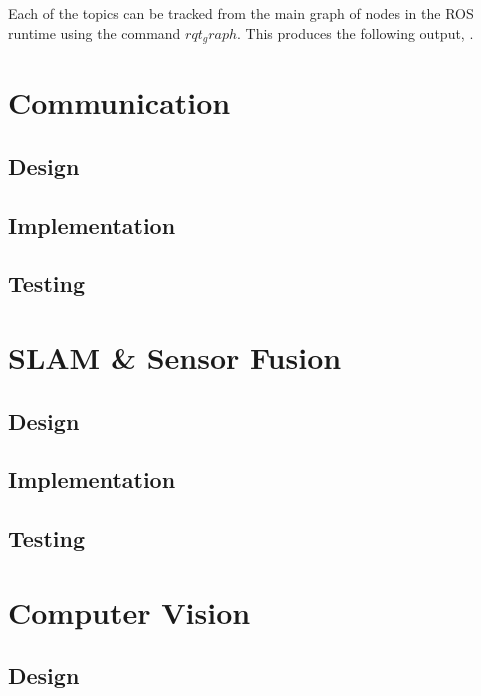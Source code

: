 Each of the topics can be tracked from the main graph of nodes in the ROS runtime using the command $rqt_graph$. This produces the following output, . 


\section{Communication}\label{soft/comms}

\subsection{Design}\label{soft/comms/design}

\subsection{Implementation}\label{soft/comms/impl}

\subsection{Testing}\label{soft/comms/test}




\section{SLAM \& Sensor Fusion}\label{soft/SLAM}

\subsection{Design}\label{soft/SLAM/design}

\subsection{Implementation}\label{soft/SLAM/impl}

\subsection{Testing}\label{soft/SLAM/test}



\section{Computer Vision}\label{soft/cv}

\subsection{Design}\label{soft/cv/design}

